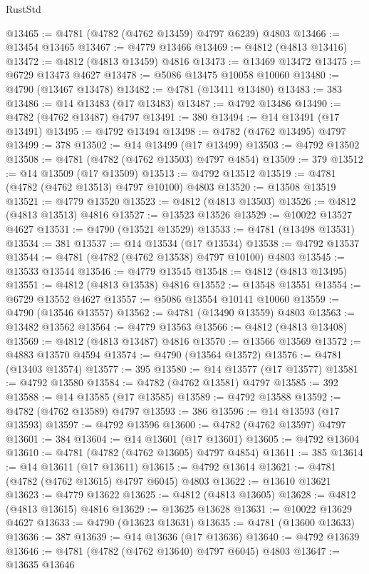 \begin{lexlean}{RustStd}
\begin{coremodule}
@13465 := @4781 (@4782 (@4762 @13459) @4797 @6239) @4803
@13466 := @13454 @13465
@13467 := @4779 @13466
@13469 := @4812 (@4813 @13416)
@13472 := @4812 (@4813 @13459) @4816
@13473 := @13469 @13472
@13475 := @6729 @13473 @4627
@13478 := @5086 @13475 @10058 @10060
@13480 := @4790 (@13467 @13478)
@13482 := @4781 (@13411 @13480)
@13483 := 383
@13486 := @14 @13483 (@17 @13483)
@13487 := @4792 @13486
@13490 := @4782 (@4762 @13487) @4797
@13491 := 380
@13494 := @14 @13491 (@17 @13491)
@13495 := @4792 @13494
@13498 := @4782 (@4762 @13495) @4797
@13499 := 378
@13502 := @14 @13499 (@17 @13499)
@13503 := @4792 @13502
@13508 := @4781 (@4782 (@4762 @13503) @4797 @4854)
@13509 := 379
@13512 := @14 @13509 (@17 @13509)
@13513 := @4792 @13512
@13519 := @4781 (@4782 (@4762 @13513) @4797 @10100) @4803
@13520 := @13508 @13519
@13521 := @4779 @13520
@13523 := @4812 (@4813 @13503)
@13526 := @4812 (@4813 @13513) @4816
@13527 := @13523 @13526
@13529 := @10022 @13527 @4627
@13531 := @4790 (@13521 @13529)
@13533 := @4781 (@13498 @13531)
@13534 := 381
@13537 := @14 @13534 (@17 @13534)
@13538 := @4792 @13537
@13544 := @4781 (@4782 (@4762 @13538) @4797 @10100) @4803
@13545 := @13533 @13544
@13546 := @4779 @13545
@13548 := @4812 (@4813 @13495)
@13551 := @4812 (@4813 @13538) @4816
@13552 := @13548 @13551
@13554 := @6729 @13552 @4627
@13557 := @5086 @13554 @10141 @10060
@13559 := @4790 (@13546 @13557)
@13562 := @4781 (@13490 @13559) @4803
@13563 := @13482 @13562
@13564 := @4779 @13563
@13566 := @4812 (@4813 @13408)
@13569 := @4812 (@4813 @13487) @4816
@13570 := @13566 @13569
@13572 := @4883 @13570 @4594
@13574 := @4790 (@13564 @13572)
@13576 := @4781 (@13403 @13574)
@13577 := 395
@13580 := @14 @13577 (@17 @13577)
@13581 := @4792 @13580
@13584 := @4782 (@4762 @13581) @4797
@13585 := 392
@13588 := @14 @13585 (@17 @13585)
@13589 := @4792 @13588
@13592 := @4782 (@4762 @13589) @4797
@13593 := 386
@13596 := @14 @13593 (@17 @13593)
@13597 := @4792 @13596
@13600 := @4782 (@4762 @13597) @4797
@13601 := 384
@13604 := @14 @13601 (@17 @13601)
@13605 := @4792 @13604
@13610 := @4781 (@4782 (@4762 @13605) @4797 @4854)
@13611 := 385
@13614 := @14 @13611 (@17 @13611)
@13615 := @4792 @13614
@13621 := @4781 (@4782 (@4762 @13615) @4797 @6045) @4803
@13622 := @13610 @13621
@13623 := @4779 @13622
@13625 := @4812 (@4813 @13605)
@13628 := @4812 (@4813 @13615) @4816
@13629 := @13625 @13628
@13631 := @10022 @13629 @4627
@13633 := @4790 (@13623 @13631)
@13635 := @4781 (@13600 @13633)
@13636 := 387
@13639 := @14 @13636 (@17 @13636)
@13640 := @4792 @13639
@13646 := @4781 (@4782 (@4762 @13640) @4797 @6045) @4803
@13647 := @13635 @13646

\end{coremodule}
\end{lexlean}
